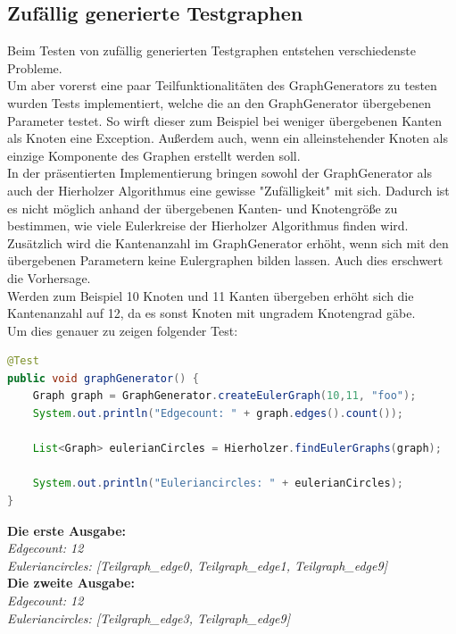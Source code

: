 \subsection{Zufällig generierte Testgraphen}

Beim Testen von zufällig generierten Testgraphen entstehen verschiedenste Probleme.\\
Um aber vorerst eine paar Teilfunktionalitäten des GraphGenerators zu testen wurden Tests implementiert, welche die an den GraphGenerator übergebenen Parameter testet. So wirft dieser zum Beispiel bei weniger übergebenen Kanten als Knoten eine Exception. Außerdem auch, wenn ein alleinstehender Knoten als einzige Komponente des Graphen erstellt werden soll.
\\
In der präsentierten Implementierung bringen sowohl der GraphGenerator als auch der Hierholzer Algorithmus eine gewisse "Zufälligkeit" mit sich. Dadurch ist es nicht möglich anhand der übergebenen Kanten- und Knotengröße zu bestimmen, wie viele Eulerkreise der Hierholzer Algorithmus finden wird. Zusätzlich wird die Kantenanzahl im GraphGenerator erhöht, wenn sich mit den übergebenen Parametern keine Eulergraphen bilden lassen. Auch dies erschwert die Vorhersage.\\
Werden zum Beispiel 10 Knoten und 11 Kanten übergeben erhöht sich die Kantenanzahl auf 12, da es sonst Knoten mit ungradem Knotengrad gäbe.\\

Um dies genauer zu zeigen folgender Test:
\begin{lstlisting}[language = java, frame = trBL]
@Test
public void graphGenerator() {
    Graph graph = GraphGenerator.createEulerGraph(10,11, "foo");
    System.out.println("Edgecount: " + graph.edges().count());

    List<Graph> eulerianCircles = Hierholzer.findEulerGraphs(graph);

    System.out.println("Euleriancircles: " + eulerianCircles);
}
\end{lstlisting}

\textbf{Die erste Ausgabe:} \\ 
\textit{Edgecount: 12}\\
\textit{Euleriancircles: [Teilgraph\_edge0, Teilgraph\_edge1, Teilgraph\_edge9]}\\

\textbf{Die zweite Ausgabe:} \\ 
\textit{Edgecount: 12} \\
\textit{Euleriancircles: [Teilgraph\_edge3, Teilgraph\_edge9]}\\

